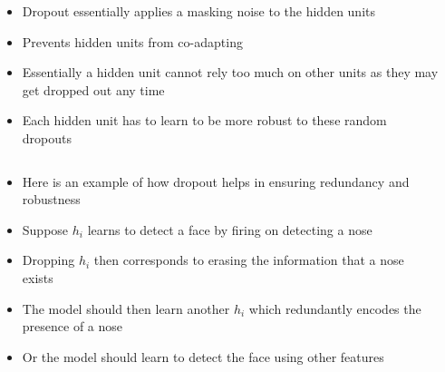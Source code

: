 \begin{frame}
	\begin{columns}									
		\begin{overlayarea}{\textwidth}{\textheight}
			\vspace{1cm}
			\hspace{1cm}
			
		\end{overlayarea}									
		\begin{overlayarea}{\textwidth}{\textheight}
			\begin{itemize}
				\justifying
				\item Dropout essentially applies a masking noise to the hidden units
				\item<2-> Prevents hidden units from co-adapting
				\item<3-> Essentially a hidden unit cannot rely too much on other units as they may get dropped out any time
				\item<4-> Each hidden unit has to learn to be more robust to these random dropouts
			\end{itemize}
		\end{overlayarea}
	\end{columns}
\end{frame}
						
\begin{frame}
	\begin{columns}
										
		\begin{overlayarea}{\textwidth}{\textheight}
			\vspace{1cm}
			\hspace{1cm}
			
		\end{overlayarea}
										
		\begin{overlayarea}{\textwidth}{\textheight}
			\begin{itemize}\justifying
				\item<2-> Here is an example of how dropout helps in ensuring redundancy and robustness
				\item<3-> Suppose $h_i$ learns to detect a face by firing on detecting a nose
				\item<4-> Dropping $h_i$ then corresponds to erasing the information that  a nose exists
				\item<5-> The model should then learn another $h_i$ which redundantly encodes the presence of a nose
				\item<6-> Or the model should learn to detect the face using other features
			\end{itemize}
		\end{overlayarea}
	\end{columns}
\end{frame}

